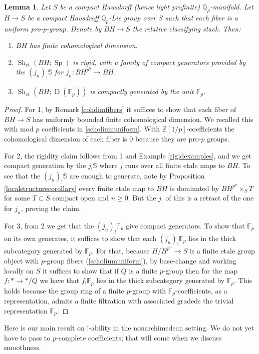 \documentclass[12pt]{article}
\newtheorem{lemma}[theorem]{Lemma}
\newcommand{\on}{\operatorname}
\newcommand{\mbb}{\mathbb}
\begin{document}
\begin{lemma}\label{uniformisgood}
Let $S$ be a compact Hausdorff (hence light profinite) $\mbb{Q}_p$-manifold.  Let $H\to S$ be a compact Hausdroff $\mbb{Q}_p$-Lie group over $S$ such that each fiber is a uniform pro-$p$-group.  Denote by $BH\to S$ the relative classifying stack.  Then:
\begin{enumerate}
\item $BH$ has finite cohomological dimension.
\item $\on{Sh}_{et}(BH;\on{Sp})$ is rigid, with a family of compact generators provided by the $(j_n)_!\mbb{S}$ for $j_n:BH^{p^n}\to BH$.
\item $\on{Sh}_{et}(BH;\on{D}(\mbb{F}_p))$ is compactly generated by the unit $\mbb{F}_p$.
\end{enumerate}
\end{lemma}
\begin{proof}
For 1, by Remark \ref{cohdimfibers} it suffices to show that each fiber of $BH\to S$ has uniformly bounded finite cohomological dimension.  We recalled this with mod $p$ coefficients in \ref{scholiumuniform}.  With $\mbb{Z}[1/p]$-coefficients the cohomological dimension of each fiber is $0$ because they are pro-$p$ groups.

For 2, the rigidity claim follows from 1 and Example \ref{rigidexamples}, and we get compact generation by the $j_!\mbb{S}$ where $j$ runs over all finite etale maps to $BH$.  To see that the $(j_n)_!\mbb{S}$ are enough to generate, note by Proposition \ref{localstructurecorollary} every finite etale map to $BH$ is dominated by $BH^{p^n}\times_ST$ for some $T\subset S$ compact open and $n\geq 0$.  But the $j_!$ of this is a retract of the one for $j_n$, proving the claim.

For 3, from 2 we get that the $(j_n)_!\mbb{F}_p$ give compact generators.  To show that $\mbb{F}_p$ on its own generates, it suffices to show that each $(j_n)_!\mbb{F}_p$ lies in the thick subcategory generated by $\mbb{F}_p$.  For that, because $H/H^{p^n}\to S$ is a finite etale group object with $p$-group fibers (\ref{scholiumuniform}), by base-change and working locally on $S$ it suffices to show that if $Q$ is a finite $p$-group then for the map $f:\ast \to \ast/Q$ we have that $f_!\mbb{F}_p$ lies in the thick subcategory generated by $\mbb{F}_p$.  This holds because the group ring of a finite $p$-group with $\mbb{F}_p$-coefficients, as a representation, admits a finite filtration with associated gradeds the trivial representation $\mbb{F}_p$.
\end{proof}
Here is our main result on $!$-ability in the nonarchimedean setting.  We do not yet have to pass to $p$-complete coefficients; that will come when we discuss smoothness.
\end{document}
